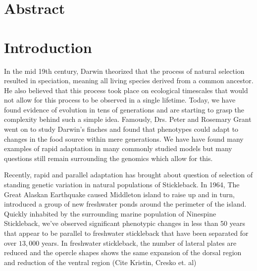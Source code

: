 \documentclass{article}
\begin{document}
\linespread{1.5}


\section{Abstract}









\section{Introduction}

In the mid 19th century,
Darwin theorized that the process of natural selection resulted in speciation, 
meaning all living species derived from a common ancestor. 
He also believed that this process took place on ecological timescales that would not allow for 
this process to be observed in a single lifetime. 
Today, we have found evidence of evolution
in tens of generations and are starting to grasp the complexity behind such a simple idea. 
Famously, Drs. Peter and Rosemary Grant went on to study Darwin's finches and
found that phenotypes could adapt to changes in the food source within mere generations.
We have have found many examples of rapid adaptation in many commonly studied models
but many questions still remain surrounding the genomics which allow for this.

Recently, rapid and parallel adaptation has brought about question of selection of
standing genetic variation in natural populations 
of Stickleback.
In 1964, The Great Alaskan Earthquake caused Middleton island to raise up and in turn, 
introduced a group of new freshwater ponds around the perimeter of the island. 
Quickly inhabited by the surrounding marine population of Ninespine Stickleback,
we've observed significant phenotypic changes in less than 50 years that appear to be 
parallel to freshwater stickleback that have been separated for over $13,000$ years. \cite{LescakE7204} 
In freshwater stickleback, 
the number of lateral plates are reduced
and the opercle shapes shows the same expansion of the dorsal region and reduction of the ventral region (Cite Kristin, Cresko et. al)
\end{document}
